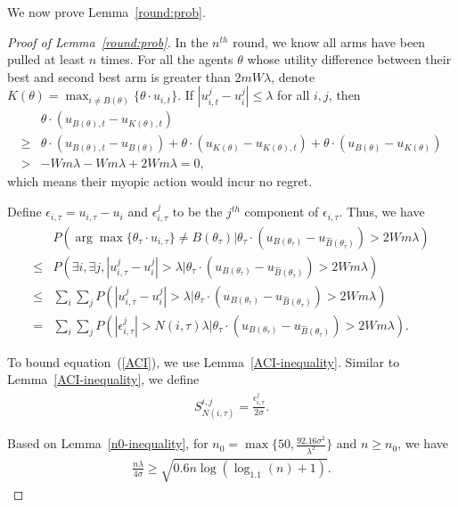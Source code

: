 \documentclass{article}
\begin{document}
We now prove Lemma~\ref{round:prob}.

\begin{proof}[Proof of Lemma~\ref{round:prob}]
In the $n^{th}$ round, we know all arms have been pulled at least $n$ times. For all the agents $\theta$ whose utility difference between their best and second best arm is greater than $2mW\lambda$, denote $K(\theta)=\max_{i\neq B(\theta)}\{\theta\cdot u_{i,t}\}$. If $|u_{i,t}^{j}-u_{i}^{j}|\leq \lambda$ for all $i,j$, then
\begin{align}
&\theta\cdot(u_{B(\theta),t}-u_{K(\theta),t}) \nonumber \\
\geq & \theta\cdot(u_{B(\theta),t}-u_{B(\theta)}) + \theta\cdot(u_{K(\theta)}-u_{K(\theta),t}) + \theta\cdot(u_{B(\theta)}-u_{K(\theta)}) \nonumber \\
> & -Wm\lambda - Wm\lambda + 2Wm\lambda = 0,\nonumber
\end{align}
which means their myopic action would incur no regret.


Define $\epsilon_{i,\tau}=u_{i,\tau}-u_i$ and $\epsilon_{i,\tau}^{j}$ to be the $j^{th}$ component of $\epsilon_{i,\tau}$. Thus, we have
\begin{align}
&P(\arg\max\{\theta_{\tau}\cdot u_{i,\tau}\}\neq B(\theta_{\tau})|\theta_{\tau}\cdot(u_{B(\theta_{\tau})}-u_{\hat{B}(\theta_{\tau})})> 2Wm\lambda)\nonumber \\
\leq &P(\exists i, \exists j, |u_{i,\tau}^{j}-u_{i}^{j}|>\lambda |\theta_{\tau}\cdot(u_{B(\theta_{\tau})}-u_{\hat{B}(\theta_{\tau})})> 2Wm\lambda) \nonumber \\
\leq & \sum_{i}\sum_{j} P(|u_{i,\tau}^{j}-u_{i}^{j}|>\lambda|\theta_{\tau}\cdot(u_{B(\theta_{\tau})}-u_{\hat{B}(\theta_{\tau})})> 2Wm\lambda) \nonumber \\
= &  \sum_{i}\sum_{j} P(|\epsilon_{i,\tau}^{j}|>N(i,\tau)\lambda|\theta_{\tau}\cdot(u_{B(\theta_{\tau})}-u_{\hat{B}(\theta_{\tau})})> 2Wm\lambda). \label{ACI}
\end{align}

To bound equation~(\ref{ACI}), we use Lemma~\ref{ACI-inequality}. Similar to Lemma~\ref{ACI-inequality}, we define
\begin{align}
S_{N(i,\tau)}^{i,j}=\frac{\epsilon_{i,\tau}^{j}}{2\sigma}. \nonumber
\end{align}

Based on Lemma~\ref{n0-inequality}, for $n_{0}=\max\{50, \frac{92.16\sigma^2}{\lambda^2}\}$ and $n\geq n_{0}$, we have
\begin{align}
\frac{n\lambda}{4\sigma}\geq \sqrt{0.6n\log(\log_{1.1}(n)+1)}. \nonumber
\end{align}


\end{proof}
\end{document}
